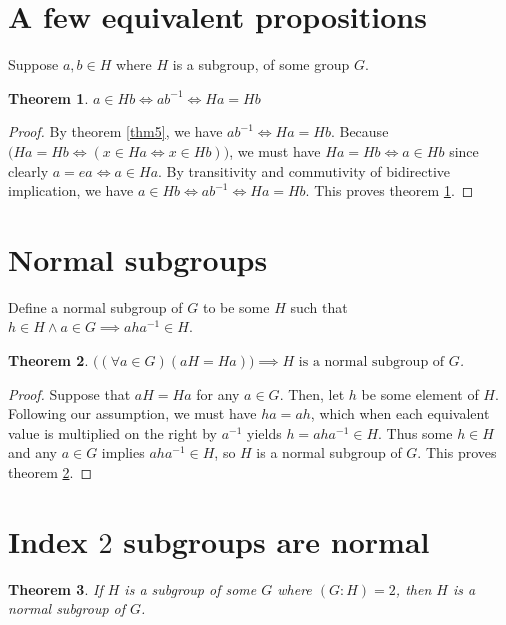 \documentclass[12pt]{article}
\newtheorem{thm}{Theorem}
\begin{document}
\section{A few equivalent propositions}

Suppose $a,b \in H$
where $H$ is a subgroup,
of some group $G$.

\begin{thm} \label{thm11}
	$a \in Hb \iff ab^{-1} \iff Ha = Hb$
\end{thm}

\begin{proof}
	By theorem \ref{thm5},
	we have $ab^{-1} \iff Ha = Hb$.
	Because $\Big(Ha = Hb \iff (x \in Ha \iff x \in Hb)\Big)$,
	we must have $Ha = Hb \iff a \in Hb$
	since clearly $a = ea \iff a \in Ha$.
	By transitivity and commutivity of bidirective implication,
	we have $a \in Hb \iff ab^{-1} \iff Ha = Hb$.
	This proves theorem \ref{thm11}.
\end{proof}

\section{Normal subgroups}

Define a normal subgroup of $G$ to be some $H$
such that $h \in H \land a \in G \implies aha^{-1} \in H$.

\begin{thm} \label{thm12}
	$\Big((\forall a \in G)(aH = Ha)\Big) \implies H \textrm{ is a normal subgroup of } G$.
\end{thm}

\begin{proof}
	Suppose that $aH = Ha$
	for any $a \in G$.
	Then, let $h$ be some
	element of $H$.
	Following our assumption,
	we must have $ha = ah$,
	which when each equivalent
	value is multiplied
	on the right
	by $a^{-1}$
	yields $h = aha^{-1} \in H$.
	Thus some $h \in H$ and any $a \in G$
	implies $aha^{-1} \in H$,
	so $H$ is a normal subgroup of $G$.
	This proves theorem \ref{thm12}.
\end{proof}

\section{Index $2$ subgroups are normal}

\begin{thm} \label{thm13}
	If $H$ is a subgroup of some $G$ where $(G:H) = 2$,
	then $H$ is a normal subgroup of $G$.
\end{thm}
\end{document}
